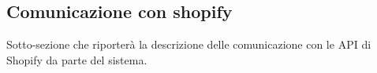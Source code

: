 \subsection{Comunicazione con shopify}

Sotto-sezione che riporterà la descrizione delle comunicazione con le API di Shopify da parte del sistema.
